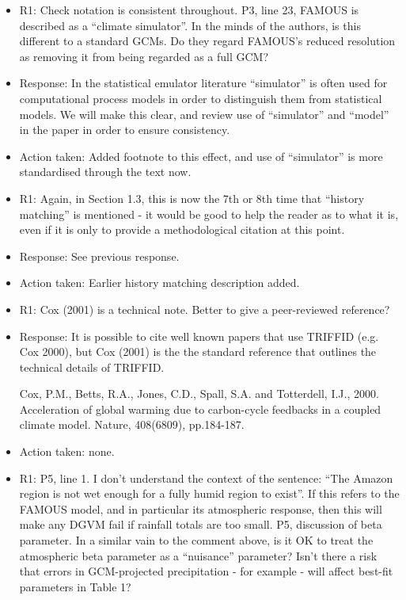 \documentclass[esd, manuscript]{copernicus}
\begin{document}
\begin{itemize}
\item{R1: Check notation is consistent throughout. P3, line 23, FAMOUS is described as a ``climate simulator''. In the minds of the authors, is this different to a standard GCMs. Do they regard FAMOUS's reduced resolution as removing it from being regarded as a full GCM?}

\item{Response: In the statistical emulator literature ``simulator'' is often used for computational process models in order to distinguish them from statistical models. We will make this clear, and review use of ``simulator'' and ``model'' in the paper in order to ensure consistency.}

\item{Action taken: Added footnote to this effect, and use of ``simulator'' is more standardised through the text now.}

\item{R1: Again, in Section 1.3, this is now the 7th or 8th time that ``history matching'' is mentioned - it would be good to help the reader as to what it is, even if it is only to provide a methodological citation at this point. }

\item{Response: See previous response.}

\item{Action taken: Earlier history matching description added.}

\item{R1: Cox (2001) is a technical note. Better to give a peer-reviewed reference?}

\item{Response: It is possible to cite well known papers that use TRIFFID (e.g. Cox 2000), but Cox (2001) is the the standard reference that outlines the technical details of TRIFFID.}

Cox, P.M., Betts, R.A., Jones, C.D., Spall, S.A. and Totterdell, I.J., 2000. Acceleration of global warming due to carbon-cycle feedbacks in a coupled climate model. Nature, 408(6809), pp.184-187.

\item{Action taken: none.}

\item{R1: P5, line 1. I don't understand the context of the sentence: ``The Amazon region is not wet enough for a fully humid region to exist''. If this refers to the FAMOUS model, and in particular its atmospheric response, then this will make any DGVM fail if rainfall totals are too small. 
P5, discussion of beta parameter. In a similar vain to the comment above, is it OK to treat the atmospheric beta parameter as a ``nuisance'' parameter? Isn't there a risk that errors in GCM-projected precipitation - for example - will affect best-fit parameters in Table 1?}


\end{itemize}
\end{document}
